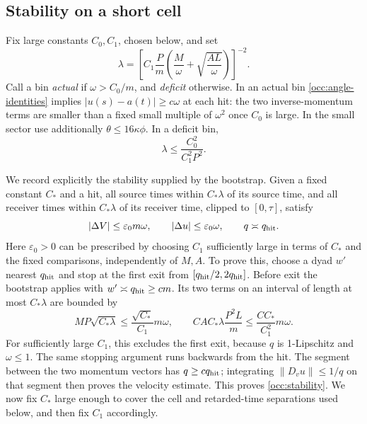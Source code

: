 \subsection{Stability on a short cell}

Fix large constants $C_0,C_1$, chosen below, and set
\begin{equation}\label{occ:lambda}
 \lambda=\left[
 C_1\frac Pm\left(\frac M\omega+
                         \sqrt{\frac{AL}{\omega}}\right)
                         \right]^{-2}.
\end{equation}
Call a bin \emph{actual} if $\omega>C_0/m$, and \emph{deficit}
otherwise. In an actual bin \eqref{occ:angle-identities} implies
$|u(s)-a(t)|\geq c\omega$ at each hit: the two inverse-momentum
terms are smaller than a fixed small multiple of $\omega^2$ once
$C_0$ is large. In the small sector use additionally
$\theta\leq16\kappa\phi$.
In a deficit bin,
\begin{equation}\label{occ:deficit-lambda}
 \lambda\leq\frac{C_0^2}{C_1^2P^2}.
\end{equation}

We record explicitly the stability supplied by the bootstrap. Given a
fixed constant $C_*$ and a hit, all source times within $C_*\lambda$
of its source time, and all receiver times within $C_*\lambda$ of its
receiver time, clipped to $[0,\tau]$, satisfy
\begin{equation}\label{occ:stability}
 |\Delta V|\leq\varepsilon_0 m\omega,
 \qquad |\Delta u|\leq\varepsilon_0\omega,
 \qquad q\asymp q_{\rm hit}.
\end{equation}
Here $\varepsilon_0>0$ can be prescribed by choosing $C_1$ sufficiently
large in terms of $C_*$ and the fixed comparisons, independently of
$M,A$.
To prove this, choose a dyad $w'$ nearest $q_{\rm hit}$ and stop at the
first exit from $[q_{\rm hit}/2,2q_{\rm hit}]$. Before exit the bootstrap
applies with $w'\asymp q_{\rm hit}\geq cm$. Its two terms on an interval
of length at most $C_*\lambda$ are bounded by
\[
 MP\sqrt{C_*\lambda}\leq
       \frac{\sqrt{C_*}}{C_1}m\omega,
 \qquad
 C A C_*\lambda\frac{P^2L}{m}
       \leq\frac{CC_*}{C_1^2}m\omega.
\]
For sufficiently large $C_1$, this excludes the first exit, because
$q$ is 1-Lipschitz and $\omega\leq1$. The same stopping argument runs
backwards from the hit. The segment between the two momentum vectors
has $q\geq cq_{\rm hit}$; integrating $\|D_vu\|\leq1/q$ on that segment
then proves the velocity estimate. This proves \eqref{occ:stability}.
We now fix $C_*$ large enough to cover the cell and retarded-time
separations used below, and then fix $C_1$ accordingly.

